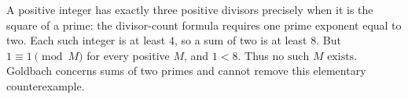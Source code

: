 A positive integer has exactly three positive divisors precisely when it is the square of a prime: the divisor-count formula requires one prime exponent equal to two. Each such integer is at least $4$, so a sum of two is at least $8$. But $1\equiv1\pmod M$ for every positive $M$, and $1<8$. Thus $\boxed{\text{no such }M\text{ exists}}$. Goldbach concerns sums of two primes and cannot remove this elementary counterexample.
